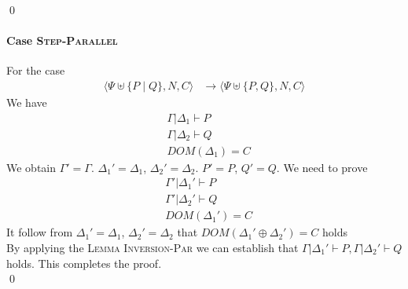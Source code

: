 \documentclass[master,english]{kuisthesis}
\theoremstyle{definition}
\begin{document}
\qed

\paragraph{Case \textsc{Step-Parallel}} For the case
\begin{align*}
  \langle\Psi \uplus\{P \mid Q\}, N, C\rangle &\longrightarrow\langle\Psi \uplus\{P, Q\}, N, C\rangle 
\end{align*}\noindent
We have
\begin{align}
    &\Gamma | \Delta_1 \vdash P
    \\&\Gamma | \Delta_2 \vdash  Q
    \\&DOM(\Delta_1) = C 
\end{align}\noindent
We obtain $\Gamma' = \Gamma$. $\Delta_1' = \Delta_1 $, $\Delta_2' = \Delta_2 $. $P' = P$, $Q' = Q$. We need to prove
\begin{align*}
    &\Gamma' | \Delta_1' \vdash P
    \\&\Gamma' | \Delta_2' \vdash  Q
    \\&DOM(\Delta_1') = C 
\end{align*}\noindent
It follow from $\Delta_1' = \Delta_1 $, $\Delta_2' = \Delta_2 $ that  $DOM(\Delta_1' \oplus \Delta_2') = C $ holds
\\By applying the \textsc{Lemma Inversion-Par}  we can establish that  $ \Gamma | \Delta_1' \vdash P, \Gamma | \Delta_2' \vdash  Q $ holds. This completes the proof.\\
\qed
\end{document}
